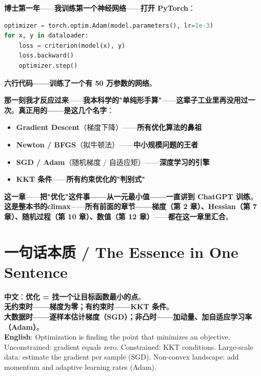 \textbf{博士第一年}——\textbf{我训练第一个神经网络}——\textbf{打开 PyTorch}：

\begin{lstlisting}[language=Python]
optimizer = torch.optim.Adam(model.parameters(), lr=1e-3)
for x, y in dataloader:
    loss = criterion(model(x), y)
    loss.backward()
    optimizer.step()
\end{lstlisting}

\textbf{六行代码——训练了一个有 50 万参数的网络}。

\textbf{那一刻我才反应过来}——\textbf{我本科学的"单纯形手算"}——\textbf{这辈子工业里再没用过一次}。\textbf{真正用的——是\textbf{这几个名字}}：

\begin{itemize}
\item \textbf{Gradient Descent}（梯度下降）——\textbf{所有优化算法的鼻祖}
\item \textbf{Newton / BFGS}（拟牛顿法）——\textbf{中小规模问题的王者}
\item \textbf{SGD / Adam}（随机梯度 / 自适应矩）——\textbf{深度学习的引擎}
\item \textbf{KKT 条件}——\textbf{所有约束优化的"判别式"}
\end{itemize}

\textbf{这一章}——\textbf{把"优化"这件事——从一元最小值——一直讲到 ChatGPT 训练}。\textbf{这是整本书的\textbf{climax}}——\textbf{所有前面的章节——梯度（第 2 章）、Hessian（第 7 章）、随机过程（第 10 章）、数值（第 12 章）}——\textbf{都在这一章里\textbf{汇合}}。

\section{一句话本质 / The Essence in One Sentence}

\begin{tcolorbox}[essbox={一句话本质}]
\textbf{中文}：\textbf{优化 = 找一个让目标函数最小的点}。\\
\textbf{无约束时——梯度为零；有约束时——KKT 条件}。\\
\textbf{大数据时——逐样本估计梯度（SGD）；非凸时——加动量、加自适应学习率（Adam）}。\\[6pt]
\textbf{English}: Optimization is finding the point that minimizes an objective. Unconstrained: gradient equals zero. Constrained: KKT conditions. Large-scale data: estimate the gradient per sample (SGD). Non-convex landscape: add momentum and adaptive learning rates (Adam).
\end{tcolorbox}

